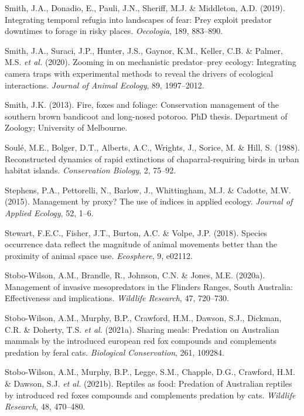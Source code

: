 \documentclass[11pt,a4paper,titlepage,twoside,openright]{style/unimelbthesis}
\begin{document}
\begin{mainmatter}
\leavevmode\hypertarget{ref-smith2019integrating}{}%
Smith, J.A., Donadio, E., Pauli, J.N., Sheriff, M.J. \& Middleton, A.D. (2019). Integrating temporal refugia into landscapes of fear: Prey exploit predator downtimes to forage in risky places. \emph{Oecologia}, 189, 883--890.

\leavevmode\hypertarget{ref-smith2020zooming}{}%
Smith, J.A., Suraci, J.P., Hunter, J.S., Gaynor, K.M., Keller, C.B. \& Palmer, M.S. \emph{et al.} (2020). Zooming in on mechanistic predator--prey ecology: Integrating camera traps with experimental methods to reveal the drivers of ecological interactions. \emph{Journal of Animal Ecology}, 89, 1997--2012.

\leavevmode\hypertarget{ref-smith2013fire}{}%
Smith, J.K. (2013). Fire, foxes and foliage: Conservation management of the southern brown bandicoot and long-nosed potoroo. PhD thesis. Department of Zoology; University of Melbourne.

\leavevmode\hypertarget{ref-soule1988reconstructed}{}%
Soulé, M.E., Bolger, D.T., Alberts, A.C., Wrights, J., Sorice, M. \& Hill, S. (1988). Reconstructed dynamics of rapid extinctions of chaparral-requiring birds in urban habitat islands. \emph{Conservation Biology}, 2, 75--92.

\leavevmode\hypertarget{ref-stephens2015management}{}%
Stephens, P.A., Pettorelli, N., Barlow, J., Whittingham, M.J. \& Cadotte, M.W. (2015). Management by proxy? The use of indices in applied ecology. \emph{Journal of Applied Ecology}, 52, 1--6.

\leavevmode\hypertarget{ref-stewart2018species}{}%
Stewart, F.E.C., Fisher, J.T., Burton, A.C. \& Volpe, J.P. (2018). Species occurrence data reflect the magnitude of animal movements better than the proximity of animal space use. \emph{Ecosphere}, 9, e02112.

\leavevmode\hypertarget{ref-stobo2020management}{}%
Stobo-Wilson, A.M., Brandle, R., Johnson, C.N. \& Jones, M.E. (2020a). Management of invasive mesopredators in the Flinders Ranges, South Australia: Effectiveness and implications. \emph{Wildlife Research}, 47, 720--730.

\leavevmode\hypertarget{ref-stobo2021sharing}{}%
Stobo-Wilson, A.M., Murphy, B.P., Crawford, H.M., Dawson, S.J., Dickman, C.R. \& Doherty, T.S. \emph{et al.} (2021a). Sharing meals: Predation on Australian mammals by the introduced european red fox compounds and complements predation by feral cats. \emph{Biological Conservation}, 261, 109284.

\leavevmode\hypertarget{ref-stobo2021reptiles}{}%
Stobo-Wilson, A.M., Murphy, B.P., Legge, S.M., Chapple, D.G., Crawford, H.M. \& Dawson, S.J. \emph{et al.} (2021b). Reptiles as food: Predation of Australian reptiles by introduced red foxes compounds and complements predation by cats. \emph{Wildlife Research}, 48, 470--480.


\end{mainmatter}
\end{document}
